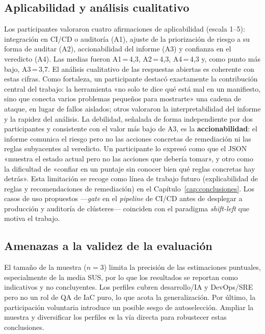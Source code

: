 \subsection{Aplicabilidad y análisis cualitativo}

Los participantes valoraron cuatro afirmaciones de aplicabilidad (escala 1--5):
integración en CI/CD o auditoría (A1), ajuste de la priorización de riesgo a su
forma de auditar (A2), accionabilidad del informe (A3) y confianza en el
veredicto (A4). Las medias fueron A1\,=\,4,3, A2\,=\,4,3, A4\,=\,4,3 y, como
punto más bajo, A3\,=\,3,7. El análisis cualitativo de las respuestas abiertas es coherente con estas cifras.
Como fortaleza, un participante destacó exactamente la contribución central del
trabajo: la herramienta «no solo te dice qué está mal en un manifiesto, sino que
conecta varios problemas pequeños para mostrarte» una cadena de ataque, en lugar
de fallos aislados; otros valoraron la interpretabilidad del informe y la
rapidez del análisis. La debilidad, señalada de forma independiente por dos
participantes y consistente con el valor más bajo de A3, es la
\textbf{accionabilidad}: el informe comunica el riesgo pero no las acciones
concretas de remediación ni las reglas subyacentes al veredicto. Un participante
lo expresó como que el \ac{JSON} «muestra el estado actual pero no las acciones
que debería tomar», y otro como la dificultad de «confiar en un puntaje sin
conocer bien qué reglas concretas hay detrás». Esta limitación se recoge como
línea de trabajo futuro (explicabilidad de reglas y recomendaciones de
remediación) en el Capítulo~\ref{cap:conclusiones}. Los casos de uso propuestos
—\textit{gate} en el \textit{pipeline} de CI/CD antes de desplegar a producción y
auditoría de clústeres— coinciden con el paradigma \textit{shift-left} que motiva
el trabajo.

\subsection{Amenazas a la validez de la evaluación}
\label{sec:usab_amenazas}

El tamaño de la muestra (\(n=3\)) limita la precisión de las estimaciones
puntuales, especialmente de la media SUS, por lo que los resultados se reportan
como indicativos y no concluyentes. Los perfiles cubren desarrollo/IA y
DevOps/SRE pero no un rol de \ac{QA} de \ac{IaC} puro, lo que acota la
generalización. Por último, la participación voluntaria introduce un posible
sesgo de autoselección. Ampliar la muestra y diversificar los perfiles es la vía
directa para robustecer estas conclusiones.

